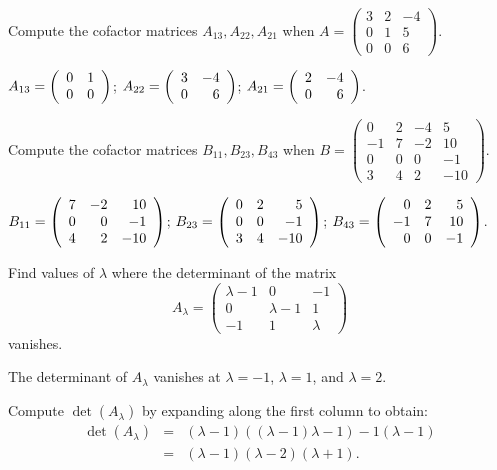 \documentclass{ximera}
\begin{document}
\begin{exercise} \label{c10.1.b7a}
Compute the cofactor matrices $A_{13}, A_{22}, A_{21}$ when 
$A = \left( \begin{array}{rrr}
 3 & 2 & -4\\
 0 & 1 & 5\\
 0 & 0 & 6\end{array} \right)$.

\begin{solution}

$A_{13} = \left(\begin{array}{rr} 0 & 1\\ 0 &0\end{array}\right)$;
$A_{22} = \left(\begin{array}{rr} 3 & -4\\ 0 &6\end{array}\right)$;
$A_{21} = \left(\begin{array}{rr} 2 & -4\\ 0 &6\end{array}\right)$.

\end{solution}
\end{exercise}
\begin{exercise} \label{c10.1.b7b}
Compute the cofactor matrices $B_{11}, B_{23}, B_{43}$ when
$B = \left( \begin{array}{rrrr}
 0 & 2 & -4 & 5\\
 -1 & 7 & -2 & 10\\
 0 & 0 & 0  & -1\\
3 & 4 & 2 & -10
\end{array} \right)$.

\begin{solution}

$B_{11} = \left(\begin{array}{rrr} 7 & -2 & 10 \\ 0 & 0 & -1 \\ 4 & 2 & -10\end{array}\right)$;
$B_{23} = \left(\begin{array}{rrr} 0 & 2 & 5 \\ 0 & 0 & -1 \\ 3 & 4 & -10\end{array}\right)$;
$B_{43} = \left(\begin{array}{rrr} 0 & 2 & 5 \\ -1 & 7 & 10 \\ 0 & 0 & -1\end{array}\right)$.

\end{solution}
\end{exercise}

\begin{exercise} \label{c10.1.c7}
Find values of $\lambda$ where the determinant of the matrix
\[
A_\lambda = \left( \begin{array}{ccr}
 \lambda -1 & 0 & -1\\
 0 & \lambda -1 & 1\\
-1 & 1 & \lambda 
\end{array} \right)
\]
vanishes.  

\begin{solution}

\ans The determinant of $A_\lambda$ vanishes at $\lambda = -1$,
$\lambda = 1$, and $\lambda = 2$.

\soln Compute $\det(A_\lambda)$ by expanding along the first column
to obtain:
\[
\begin{array}{rcl}
\det(A_\lambda) & = &
(\lambda - 1)((\lambda - 1)\lambda - 1) - 1(\lambda - 1) \\
& = & (\lambda - 1)(\lambda - 2)(\lambda + 1).
\end{array}
\]

\end{solution}
\end{exercise}
\end{document}
